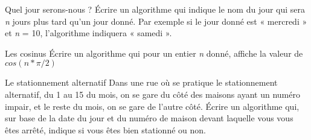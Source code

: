 \begin{Exercice}{Quel jour serons-nous ?}
{
Écrire un algorithme qui indique le nom du jour qui sera \textit{n}
jours plus tard qu’un jour donné. Par exemple si le jour donné est «
mercredi » et \textit{n} = 10, l’algorithme indiquera « samedi ».}
\end{Exercice}

\begin{Exercice}{Les cosinus}
Écrire un algorithme qui pour un entier \textit{n} donné, affiche la
valeur de $cos(n * \pi/2)$
\end{Exercice}

\begin{Exercice}{Le stationnement alternatif}
{
Dans une rue où se pratique le stationnement alternatif, du 1 au 15 du
mois, on se gare du côté des maisons ayant un numéro impair, et le
reste du mois, on se gare de l'autre côté. Écrire un
algorithme qui, sur base de la date du jour et du numéro de maison
devant laquelle vous vous êtes arrêté, indique si vous êtes bien
stationné ou non. }
\end{Exercice}
